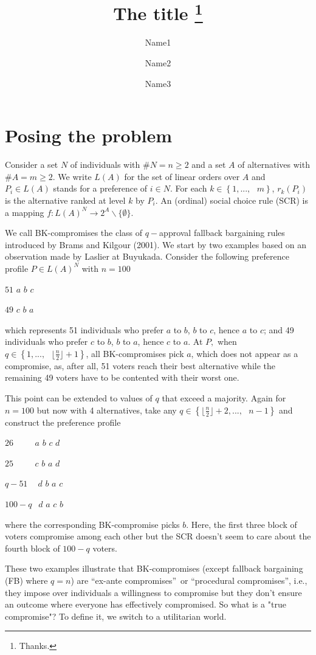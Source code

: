\documentclass[version=3.21, pagesize, notitlepage, twoside=off, bibliography=totoc, DIV=calc, fontsize=12pt, a4paper]{scrartcl}
\title{The title \thanks{Thanks.}}
\author{Name1}
\author{Name2}
\affil{Université Paris-Dauphine, PSL Research University, CNRS, LAMSADE, 75016 PARIS, FRANCE\\
	\href{mailto:olivier.cailloux@dauphine.fr}{olivier.cailloux@dauphine.fr}
}
\author{Name3}
\affil{Affil2}
\begin{document}
\section{Posing the problem}

Consider a set $N$ of individuals with $\#N=n\geq 2$ and a set $A$ of
alternatives with $\#A=m\geq 2$. We write $L(A)$ for the set of linear
orders over $A$ and $P_{i}\in L(A)$ stands for a preference of $i\in N$. For
each $k\in \left\{ 1,...,\text{ }m\right\} $, $r_{k}(P_{i})$ is the
alternative ranked at level $k$ by $P_{i}$. An (ordinal) social choice rule
(SCR) is a mapping $f:L(A)^{N}\rightarrow 2^{A}\backslash \{\emptyset \}$.

We call BK-compromises the class of $q-$approval fallback bargaining rules
introduced by Brams and Kilgour (2001). We start by two examples based on an
observation made by Laslier at Buyukada. Consider the following preference
profile $P\in L(A)^{N}$ with $n=100$

$51$ $a$ $b$ $c$

$49$ $c$ $b$ $a$

which represents 51 individuals who prefer $a$ to $b$, $b$ to $c$, hence $a$
to $c$; and 49 individuals who prefer $c$ to $b$, $b$ to $a$, hence $c$ to $a
$. At $P,$ when $q\in \left\{ 1,...,\text{ }\lfloor \frac{n}{2}\rfloor
+1\right\} $, all BK-compromises pick $a$, which does not appear as a
compromise, as, after all, 51 voters reach their best alternative while the
remaining 49 voters have to be contented with their worst one.

This point can be extended to values of $q$ that exceed a majority. Again
for $n=100$ but now with 4 alternatives, take any $q\in \left\{ \lfloor 
\frac{n}{2}\rfloor +2,...,\text{ }n-1\right\} $ and construct the preference
profile

$26$ $\ \ \ \ \ \ \ \ \ \ a$ $b$ $c$ $d$

$25$ $\ \ \ \ \ \ \ \ \ \ c$ $b$ $a$ $d$

$q-51$ $\ \ \ \ d$ $b$ $a$ $c$

$100-q$ $\ \ d$ $a$ $c$ $b$

\bigskip where the corresponding BK-compromise picks $b$. Here, the first
three block of voters compromise among each other but the SCR doesn't seem
to care about the fourth block of $100-q$ voters.

These two examples illustrate that BK-compromises (except fallback
bargaining (FB) where $q=n$) are \textquotedblleft ex-ante
compromises\textquotedblright\ or \textquotedblleft procedural
compromises\textquotedblright , i.e., they impose over individuals a
willingness to compromise but they don't ensure an outcome where everyone
has effectively compromised. So what is a "true compromise"? To define it,
we switch to a utilitarian world.
\end{document}
